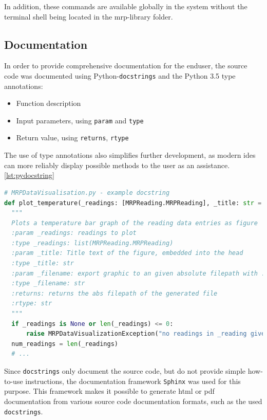 In addition, these commands are available globally in the system without
the terminal shell being located in the \gls{mrp}-library folder.

\hypertarget{documentation}{%
\subsection{Documentation}\label{documentation}}

In order to provide comprehensive documentation for the enduser, the
source code was documented using
Python-\passthrough{\lstinline!docstrings!}
\cite{PythonDocstringReference} and the Python 3.5 type annotations:

\begin{itemize}
\tightlist
\item
  Function description
\item
  Input parameters, using \passthrough{\lstinline!param!} and
  \passthrough{\lstinline!type!}
\item
  Return value, using \passthrough{\lstinline!returns!},
  \passthrough{\lstinline!rtype!}
\end{itemize}

The use of type annotations also simplifies further development, as
modern \gls{ide}s can more reliably display possible methods to the user
as an assistance. \ref{lst:pydocstring}

\begin{lstlisting}[language=Python, caption={Documentation using Python docstring example}, label=lst:pydocstring]
# MRPDataVisualisation.py - example docstring
def plot_temperature(_readings: [MRPReading.MRPReading], _title: str = '', _filename: str = None, _unit: str = "degree C") -> str:
  """
  Plots a temperature bar graph of the reading data entries as figure
  :param _readings: readings to plot
  :type _readings: list(MRPReading.MRPReading)
  :param _title: Title text of the figure, embedded into the head
  :type _title: str
  :param _filename: export graphic to an given absolute filepath with .png
  :type _filename: str
  :returns: returns the abs filepath of the generated file
  :rtype: str
  """
  if _readings is None or len(_readings) <= 0:
      raise MRPDataVisualizationException("no readings in _reading given")
  num_readings = len(_readings)
  # ...
\end{lstlisting}

Since \passthrough{\lstinline!docstrings!} only document the source
code, but do not provide simple how-to-use instructions, the
documentation framework \passthrough{\lstinline!Sphinx!}
\cite{SphinxDocumentation} was used for this purpose. This framework
makes it possible to generate \gls{html} or \gls{pdf} documentation from
various source code documentation formats, such as the used
\passthrough{\lstinline!docstrings!}.

